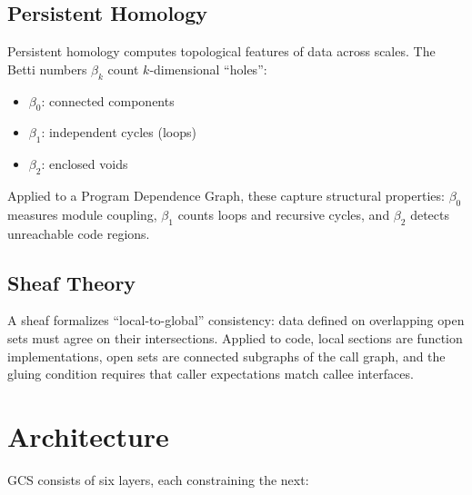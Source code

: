 \documentclass[11pt,a4paper]{article}
\begin{document}
\subsection{Persistent Homology}

Persistent homology \cite{edelsbrunner2002topological,carlsson2009topology} computes
topological features of data across scales. The Betti numbers $\beta_k$ count
$k$-dimensional ``holes'':
\begin{itemize}
    \item $\beta_0$: connected components
    \item $\beta_1$: independent cycles (loops)
    \item $\beta_2$: enclosed voids
\end{itemize}

Applied to a Program Dependence Graph, these capture structural properties:
$\beta_0$ measures module coupling, $\beta_1$ counts loops and recursive cycles,
and $\beta_2$ detects unreachable code regions.

\subsection{Sheaf Theory}

A sheaf \cite{kashiwara1990sheaves} formalizes ``local-to-global'' consistency:
data defined on overlapping open sets must agree on their intersections.
Applied to code, local sections are function implementations, open sets are
connected subgraphs of the call graph, and the gluing condition requires
that caller expectations match callee interfaces.

\section{Architecture}

GCS consists of six layers, each constraining the next:
\end{document}
